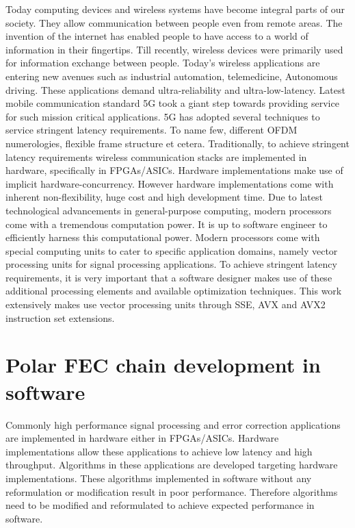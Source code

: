 Today computing devices and wireless systems have become integral parts of our society. They allow communication between people even from remote areas. The invention of the internet has enabled people to have access to a world of information in their fingertips. Till recently, wireless devices were primarily used for information exchange between people. Today's wireless applications are entering new avenues such as industrial automation, telemedicine, Autonomous driving. These applications demand ultra-reliability and ultra-low-latency. Latest mobile communication standard 5G took a giant step towards providing service for such mission critical applications. 5G has adopted several techniques to service stringent latency requirements. To name few, different OFDM numerologies, flexible frame structure et cetera. Traditionally, to achieve stringent latency requirements wireless communication stacks are implemented in hardware, specifically in FPGAs/ASICs. Hardware implementations make use of implicit hardware-concurrency. However hardware implementations come with inherent non-flexibility, huge cost and high development time. Due to latest technological advancements in general-purpose computing, modern processors come with a tremendous computation power. It is up to software engineer to efficiently harness this computational power. Modern processors come with special computing units to cater to specific application domains, namely vector processing units for signal processing applications. To achieve stringent latency requirements, it is very important that a software designer makes use of these additional processing elements and available optimization techniques. This work extensively makes use vector processing units through SSE, AVX and AVX2 instruction set extensions.

%
%

\section{Polar FEC chain development in software}
Commonly high performance signal processing and error correction applications are implemented in hardware either in FPGAs/ASICs. Hardware implementations allow these applications to achieve low latency and high throughput. Algorithms in these applications are developed targeting hardware implementations. These algorithms implemented in software without any reformulation or modification result in poor performance. Therefore algorithms need to be modified and reformulated to achieve expected performance in software. \newline

